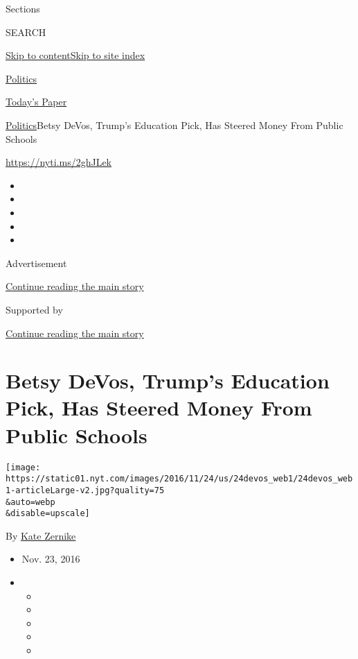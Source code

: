 Sections

SEARCH

\protect\hyperlink{site-content}{Skip to
content}\protect\hyperlink{site-index}{Skip to site index}

\href{https://www.nytimes.com/section/politics}{Politics}

\href{https://myaccount.nytimes.com/auth/login?response_type=cookie\&client_id=vi}{}

\href{https://www.nytimes.com/section/todayspaper}{Today's Paper}

\href{/section/politics}{Politics}\textbar{}Betsy DeVos, Trump's
Education Pick, Has Steered Money From Public Schools

\url{https://nyti.ms/2ghJLek}

\begin{itemize}
\item
\item
\item
\item
\item
\end{itemize}

Advertisement

\protect\hyperlink{after-top}{Continue reading the main story}

Supported by

\protect\hyperlink{after-sponsor}{Continue reading the main story}

\hypertarget{betsy-devos-trumps-education-pick-has-steered-money-from-public-schools}{%
\section{Betsy DeVos, Trump's Education Pick, Has Steered Money From
Public
Schools}\label{betsy-devos-trumps-education-pick-has-steered-money-from-public-schools}}

\texttt{[image: https://static01.nyt.com/images/2016/11/24/us/24devos\_web1/24devos\_web1-articleLarge-v2.jpg?quality=75\\\&auto=webp\\\&disable=upscale]}

By \href{http://www.nytimes.com/by/kate-zernike}{Kate Zernike}

\begin{itemize}
\item
  Nov. 23, 2016
\item
  \begin{itemize}
  \item
  \item
  \item
  \item
  \item
  \end{itemize}
\end{itemize}

